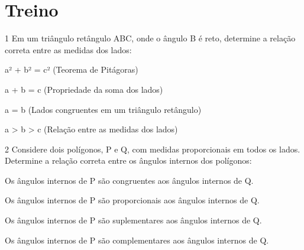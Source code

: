 \section{Treino}

\num{1} Em um triângulo retângulo ABC, onde o ângulo B é reto, determine a
relação correta entre as medidas dos lados:

\begin{escolha}
\item a² + b² = c² (Teorema de Pitágoras)
\item a + b = c (Propriedade da soma dos lados)
\item a = b (Lados congruentes em um triângulo retângulo)
\item a \textgreater{} b \textgreater{} c (Relação entre as medidas dos lados)
\end{escolha}



\num{2} Considere dois polígonos, P e Q, com medidas proporcionais em todos
os lados. Determine a relação correta entre os ângulos internos dos
polígonos:

\begin{escolha}
  \item Os ângulos internos de P são congruentes aos ângulos internos de Q.
  \item Os ângulos internos de P são proporcionais aos ângulos internos de Q.
  \item Os ângulos internos de P são suplementares aos ângulos internos de Q.
  \item Os ângulos internos de P são complementares aos ângulos internos de Q.
\end{escolha}

